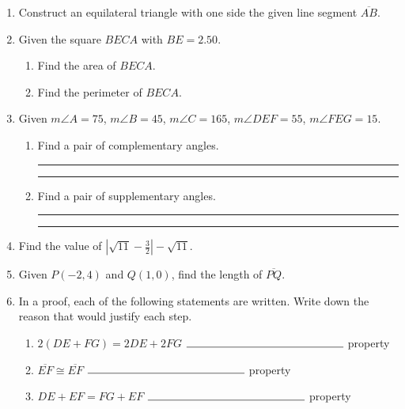\begin{enumerate}
\newpage
\item Construct an equilateral triangle with one side the given line segment $\overline{AB}$.\\
  \vspace{5cm}
  \begin{center}
  \end{center}
  \vspace{2cm}

\item Given the square $BECA$ with $BE=2.50$.
  \begin{enumerate}
    \item Find the area of $BECA$. \vspace{2cm}
    \item Find the perimeter of $BECA$. \vspace{2cm}
  \end{enumerate}

\item Given $m \angle A=75$, $m \angle B=45$, $m \angle C=165$, $m \angle DEF=55$, $m \angle FEG=15$. \bigskip
  \begin{enumerate}
    \item Find a pair of complementary angles. \rule{3cm}{0.15mm} \hspace{1cm} \rule{3cm}{0.15mm} \bigskip
    \item Find a pair of supplementary angles. \rule{3cm}{0.15mm} \hspace{1cm} \rule{3cm}{0.15mm} \bigskip
  \end{enumerate}

\newpage
\item Find the value of $|\sqrt{11}-\frac{3}{2}|-\sqrt{11}$. \vspace{4cm}

\item Given $P(-2,4)$ and $Q(1,0)$, find the length of $\overline{PQ}$.
    \vspace{5cm}

\item In a proof, each of the following statements are written. Write down the reason that would justify each step. \bigskip
  \begin{enumerate}
    \item $2(DE + FG)=2DE+2FG$  \hspace{0.6cm} $\rule{5cm}{0.15mm}$ property \bigskip
    \item $\overline{EF} \cong \overline{EF}$ \hspace{4cm} $\rule{5cm}{0.15mm}$ property \bigskip
    \item $DE+EF= FG+EF$  \hspace{1.7cm} $\rule{5cm}{0.15mm}$ property
  \end{enumerate}


\end{enumerate}

